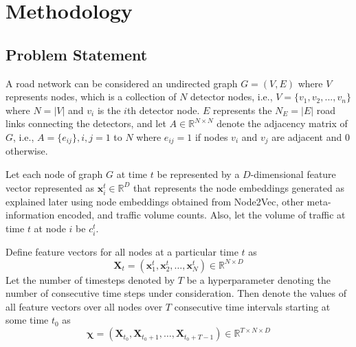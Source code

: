 \documentclass[conference]{IEEEtran}
\begin{document}
\section{Methodology}

\subsection{\textbf{Problem Statement}}

A road network can be considered an undirected graph $G = (V, E)$ where $V$ represents nodes, which is a collection of $N$ detector nodes, i.e., $V=\{v_1,v_2,...,v_n\}$ where $N = |V|$ and $v_i$ is the $i$th detector node. $E$ represents the $N_E = |E|$ road links connecting the detectors, and let $A \in \mathbb{R}^{N \times N}$ denote the adjacency matrix of $G$, i.e., $A = \{e_{ij}\}, i,j=1$ to $N$ where $e_{ij} = 1$ if nodes $v_i$ and $v_j$ are adjacent and $0$ otherwise.

Let each node of graph $G$ at time $t$ be represented by a $D$-dimensional feature vector represented as $\mathbf{x}_i^t \in \mathbb{R}^D$ that represents the node embeddings generated as explained later using node embeddings obtained from Node2Vec, other meta-information encoded, and traffic volume counts. Also, let the volume of traffic at time $t$ at node $i$ be $c_i^t$.

Define feature vectors for all nodes at a particular time $t$ as
\begin{equation*}
    \mathbf{X}_t = (\mathbf{x}_1^t, \mathbf{x}_2^t, \ldots, \mathbf{x}_N^t) \in \mathbb{R}^{N \times D} \tag{1}
\end{equation*}
Let the number of timesteps denoted by $T$ be a hyperparameter denoting the number of consecutive time steps under consideration. Then denote the values of all feature vectors over all nodes over $T$ consecutive time intervals starting at some time $t_0$ as
\begin{equation}
    \bm{\chi} = (\mathbf{X}_{t_0}, \mathbf{X}_{t_0+1}, \ldots, \mathbf{X}_{t_0+T-1}) \in \mathbb{R}^{T \times N \times D} \tag{2}
\end{equation}
\end{document}
